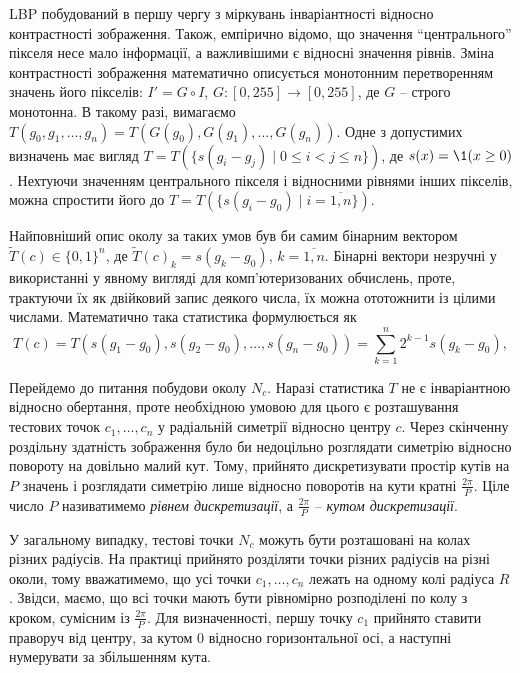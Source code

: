 LBP побудований в першу чергу з міркувань інваріантності відносно контрастності зображення.
Також, емпірично відомо, що значення ``центрального'' пікселя несе мало інформації, а важливішими є відносні значення рівнів.  
Зміна контрастності зображення математично описується монотонним перетворенням значень його пікселів: $I' = G \circ I$, $G \colon [0,255] \to [0,255]$, де $G$ -- строго монотонна.
В такому разі, вимагаємо $T(g_0, g_1, \dots , g_n) = T(G(g_0), G(g_1), \dots , G(g_n))$.
Одне з допустимих визначень має вигляд $T = T(\{s(g_i - g_j) \mid 0\le i<j \le n\})$, де $s(x) = \1(x \ge 0)$.
Нехтуючи значенням центрального пікселя і відносними рівнями інших пікселів, можна спростити його до $T = T(\{s(g_i - g_0) \mid i=\overline{1,n}\})$.

Найповніший опис околу за таких умов був би самим бінарним вектором $\tilde T(c) \in \{0,1\}^n$,
де $\tilde T(c)_k = s(g_k - g_0)$, $k=\overline{1,n}$.
Бінарні вектори незручні у використанні у явному вигляді для комп'ютеризованих обчислень, проте, трактуючи їх як двійковий запис деякого числа, 
їх можна ототожнити із цілими числами. Математично така статистика формулюється як 
\begin{equation}\label{e:ojala-T}
    T(c) = T(s(g_1 - g_0), s(g_2 - g_0), \dots , s(g_n - g_0)) = \sum_{k=1}^n 2^{k-1}s(g_k-g_0),
\end{equation}

Перейдемо до питання побудови околу $N_c$. 
Наразі статистика $T$ не є інваріантною відносно обертання, проте необхідною умовою для цього є розташування тестових точок $c_1,\dots ,c_n$ у 
радіальній симетрії відносно центру $c$.
Через скінченну роздільну здатність зображення було би недоцільно розглядати симетрію відносно повороту на довільно малий кут.
Тому, прийнято дискретизувати простір кутів на $P$ значень і розглядати симетрію лише відносно поворотів на кути кратні $\frac{2\pi}{P}$.
Ціле число $P$ називатимемо \emph{рівнем дискретизації}, а $\frac{2\pi}{P}$ -- \emph{кутом дискретизації}. 

У загальному випадку, тестові точки $N_c$ можуть бути розташовані на колах різних радіусів. 
На практиці прийнято розділяти точки різних радіусів на різні околи, тому вважатимемо, що усі точки $c_1,\dots ,c_n$ лежать на одному колі радіуса $R$.
Звідси, маємо, що всі точки мають бути рівномірно розподілені по колу з кроком, сумісним із $\frac{2\pi}{P}$.
Для визначенності, першу точку $c_1$ прийнято ставити праворуч від центру, за кутом 0 відносно горизонтальної осі, а наступні нумерувати за збільшенням кута.

